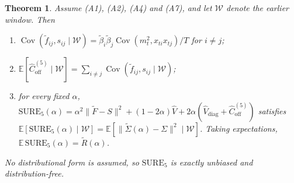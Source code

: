 \documentclass[11pt]{article}
\newtheorem{theorem}{Theorem}
\theoremstyle{remark}
\begin{document}
\begin{theorem}\label{thm:stale}
Assume (A1), (A2), (A4) and (A7), and let $\mathcal{W}$ denote the earlier window. Then
\begin{enumerate}
  \item $\operatorname{Cov}(\tilde f_{ij}, s_{ij} \mid \mathcal{W}) = \tilde\beta_i\tilde\beta_j\operatorname{Cov}(m_t^2, x_{ti}x_{tj})/T$ for $i \ne j$;
  \item $\mathbb{E}[\hat C^{(5)}_{\mathrm{off}} \mid \mathcal{W}] = \sum_{i \ne j}\operatorname{Cov}(\tilde f_{ij}, s_{ij} \mid \mathcal{W})$;
  \item for every fixed $\alpha$, $\mathrm{SURE}_5(\alpha) = \alpha^2\|\tilde F - S\|^2 + (1-2\alpha)\hat V + 2\alpha(\hat V_{\mathrm{diag}} + \hat C^{(5)}_{\mathrm{off}})$ satisfies $\mathbb{E}[\mathrm{SURE}_5(\alpha) \mid \mathcal{W}] = \mathbb{E}[\|\tilde\Sigma(\alpha) - \Sigma\|^2 \mid \mathcal{W}]$. Taking expectations, $\mathbb{E}\,\mathrm{SURE}_5(\alpha) = \tilde R(\alpha)$.
\end{enumerate}
No distributional form is assumed, so $\mathrm{SURE}_5$ is exactly unbiased and distribution-free.
\end{theorem}
\end{document}
